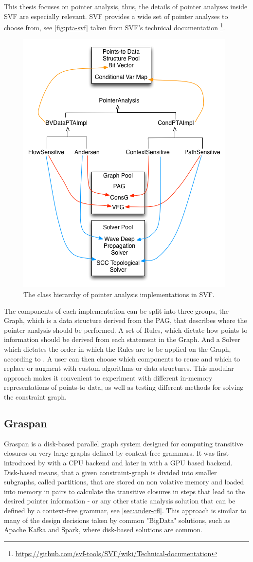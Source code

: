 This thesis focuses on pointer analysis, thus, the details of pointer analyses inside SVF are especially relevant. SVF provides a wide set of pointer analyses to choose from, see \autoref{fig:pta-svf} taken from SVF's technical documentation \footnote{\url{https://github.com/svf-tools/SVF/wiki/Technical-documentation}}.
\begin{figure}
    \centering
    \includegraphics[width=.6\textwidth]{img/pta-svf.png}
    \caption{The class hierarchy of pointer analysis implementations in SVF.}
    \label{fig:pta-svf}
\end{figure}
The components of each implementation can be split into three groups, the Graph, which is a data structure derived from the PAG, that describes where the pointer analysis should be performed.
A set of Rules, which dictate how points-to information should be derived from each statement in the Graph. And a Solver which dictates the order in which the Rules are to be applied on the Graph, according to \cite{sui2016svf}.
A user can then choose which components to reuse and which to replace or augment with custom algorithms or data structures.
This modular approach makes it convenient to experiment with different in-memory representations of points-to data, as well as testing different methods for solving the constraint graph.
\subsection{Graspan}\label{sec:graspan}
Graspan is a disk-based parallel graph system designed for computing transitive closures on very large graphs defined by context-free grammars. It was first introduced by \cite{wang2017graspan} with a CPU backend and later in \cite{zuo2021systemizing} with a GPU based backend.
Disk-based means, that a given constraint-graph is divided into smaller subgraphs, called partitions, that are stored on non volative memory and loaded into memory in pairs to calculate the transitive closures in steps that lead to the desired pointer information - or any other static analysis solution that can be defined by a context-free grammar, see \autoref{sec:ander-cfl}.
This approach is similar to many of the design decisions taken by common "BigData" solutions, such as Apache Kafka and Spark, where disk-based solutions are common.

